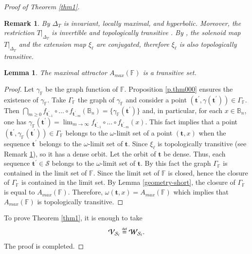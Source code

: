 \documentclass[11pt,reqno]{amsart}
\theoremstyle{plain}
\newtheorem{lemma}[theorem]{Lemma}
\newtheorem{remark}[theorem]{Remark}
\newtheorem*{theorem A}{Theorem A}
\newtheorem*{theorem B}{Theorem B}
\newtheorem*{theorem C}{Theorem C}
\newtheorem*{theorem 1}{Theorem 1}
\newtheorem*{theorem 2}{Theorem 2}
\newtheorem*{theorem 3}{Theorem 3}
\newcommand{\eqdef}{\stackrel{\scriptscriptstyle\rm def}{=}}
\numberwithin{equation}{section}
\begin{document}
\begin{proof}[Proof of Theorem \ref{thm1}]
\begin{remark}\label{tra}
By \cite[Theorem~7.1]{robinson1998dynamical} $\Delta_T$ is invariant, locally maximal, and hyperbolic.
Moreover, the restriction $T|_{\Delta_T}$ is invertible and topologically transitive \cite[Proposition~7.5]{robinson1998dynamical}.
By \cite[Theorem~7.7]{robinson1998dynamical}, the solenoid map $T|_{\Delta_T}$ and the extension map $\xi_\ell$ are conjugated, therefore $\xi_\ell$ is also topologically transitive.
\end{remark}

\begin{lemma}\label{milnor}
The maximal attractor $A_{max}(\mathbb{F})$ is a transitive set.
\end{lemma}

\begin{proof}
Let $\gamma_\mathbb{F}$ be the graph function of $\mathbb{F}$. Proposition \ref{p.thm000} ensures the existence of $\gamma_\mathbb{F}$.
Take $\Gamma_\mathbb{F}$ the graph of $\gamma_\mathbb{F}$ and consider a point $(\textbf{t}^{\prime} , \gamma(\textbf{t}^{\prime}))\in \Gamma_\mathbb{F}$.
Then $\bigcap_{m\geq 0}f_{\textbf{t}^{\prime}_{-1}}\circ \dots \circ f_{\textbf{t}^{\prime}_{-m}}(\mathbb{B}_n)= \{\gamma_\mathbb{F}(\textbf{t}^{\prime})\}$ and, in particular, for each $x \in \mathbb{B}_n$, one has $\gamma_\mathbb{F}(\textbf{t}^{\prime})=\lim_{m \to \infty}f_{\textbf{t}^{\prime}_{-1}}\circ \dots \circ f_{\textbf{t}^{\prime}_{-m}}(x)$.
This fact implies that a point $(\textbf{t}^{\prime} , \gamma_\mathbb{F}(\textbf{t}^{\prime}))\in \Gamma_\mathbb{F}$ belongs to the $\omega$-limit set of a point $(\textbf{t} , x)$ when the sequence $\textbf{t}^{\prime}$ belongs to the $\omega$-limit set of $\textbf{t}$. Since $\xi_\ell$ is topologically transitive (see Remark \ref{tra}), so it has a dense orbit. Let the orbit of $\textbf{t}$ be dense. Thus, each sequence $\textbf{t}^{\prime} \in \mathcal{S}$ belongs to the $\omega$-limit set of $\textbf{t}$. By this fact the graph $\Gamma_\mathbb{F}$ is contained in the limit set of $\mathbb{F}$.
Since the limit set of $\mathbb{F}$ is closed, hence the closure of $\Gamma_\mathbb{F}$ is contained in the limit set. By Lemma \ref{geometry-short}, the closure of $\Gamma_\mathbb{F}$ is equal to $A_{max}(\mathbb{F})$.
Therefore, $\omega(\textbf{t} , x)=A_{max}(\mathbb{F})$ which implies that $A_{max}(\mathbb{F})$ is topologically transitive.
\end{proof}

To prove Theorem \ref{thm1}, it is enough to take
\begin{equation}\label{ww}
 \mathcal{V}_{\mathcal{S}_\ell} \eqdef \mathcal{W}_{\mathcal{S}_\ell}.
\end{equation}
The proof is completed.
\end{proof}
\end{document}
